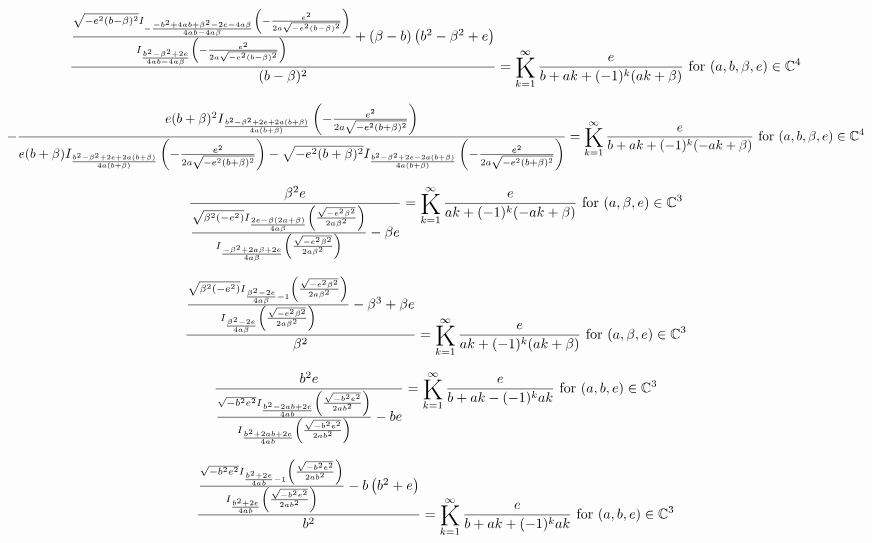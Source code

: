 \documentclass{article}
\newcommand{\bigK}{\mathop{\raisebox{-5pt}{\huge K}}}
\begin{document}
\[\frac{\frac{\sqrt{-e^2 (b-\beta )^2} I_{-\frac{-b^2+4 a b+\beta ^2-2 e-4 a \beta }{4 a b-4 a \beta }}\left(-\frac{e^2}{2 a \sqrt{-e^2 (b-\beta )^2}}\right)}{I_{\frac{b^2-\beta ^2+2 e}{4 a b-4 a \beta }}\left(-\frac{e^2}{2 a \sqrt{-e^2 (b-\beta )^2}}\right)}+(\beta -b) \left(b^2-\beta ^2+e\right)}{(b-\beta )^2}=\bigK_{k=1}^{\infty}\frac{e}{b+a k+(-1)^k (a k+\beta )}\text{ for }(a,b,\beta ,e)\in \mathbb{C}^4\] 

\[-\frac{e (b+\beta )^2 I_{\frac{b^2-\beta ^2+2 e+2 a (b+\beta )}{4 a (b+\beta )}}\left(-\frac{e^2}{2 a \sqrt{-e^2 (b+\beta )^2}}\right)}{e (b+\beta ) I_{\frac{b^2-\beta ^2+2 e+2 a (b+\beta )}{4 a (b+\beta )}}\left(-\frac{e^2}{2 a \sqrt{-e^2 (b+\beta )^2}}\right)-\sqrt{-e^2 (b+\beta )^2} I_{\frac{b^2-\beta ^2+2 e-2 a (b+\beta )}{4 a (b+\beta )}}\left(-\frac{e^2}{2 a \sqrt{-e^2 (b+\beta )^2}}\right)}=\bigK_{k=1}^{\infty}\frac{e}{b+a k+(-1)^k (-a k+\beta )}\text{ for }(a,b,\beta ,e)\in \mathbb{C}^4\] 

\[\frac{\beta ^2 e}{\frac{\sqrt{\beta ^2 \left(-e^2\right)} I_{\frac{2 e-\beta  (2 a+\beta )}{4 a \beta }}\left(\frac{\sqrt{-e^2 \beta ^2}}{2 a \beta ^2}\right)}{I_{\frac{-\beta ^2+2 a \beta +2 e}{4 a \beta }}\left(\frac{\sqrt{-e^2 \beta ^2}}{2 a \beta ^2}\right)}-\beta  e}=\bigK_{k=1}^{\infty}\frac{e}{a k+(-1)^k (-a k+\beta )}\text{ for }(a,\beta ,e)\in \mathbb{C}^3\] 

\[\frac{\frac{\sqrt{\beta ^2 \left(-e^2\right)} I_{\frac{\beta ^2-2 e}{4 a \beta }-1}\left(\frac{\sqrt{-e^2 \beta ^2}}{2 a \beta ^2}\right)}{I_{\frac{\beta ^2-2 e}{4 a \beta }}\left(\frac{\sqrt{-e^2 \beta ^2}}{2 a \beta ^2}\right)}-\beta ^3+\beta  e}{\beta ^2}=\bigK_{k=1}^{\infty}\frac{e}{a k+(-1)^k (a k+\beta )}\text{ for }(a,\beta ,e)\in \mathbb{C}^3\] 

\[\frac{b^2 e}{\frac{\sqrt{-b^2 e^2} I_{\frac{b^2-2 a b+2 e}{4 a b}}\left(\frac{\sqrt{-b^2 e^2}}{2 a b^2}\right)}{I_{\frac{b^2+2 a b+2 e}{4 a b}}\left(\frac{\sqrt{-b^2 e^2}}{2 a b^2}\right)}-b e}=\bigK_{k=1}^{\infty}\frac{e}{b+a k-(-1)^k a k}\text{ for }(a,b,e)\in \mathbb{C}^3\] 

\[\frac{\frac{\sqrt{-b^2 e^2} I_{\frac{b^2+2 e}{4 a b}-1}\left(\frac{\sqrt{-b^2 e^2}}{2 a b^2}\right)}{I_{\frac{b^2+2 e}{4 a b}}\left(\frac{\sqrt{-b^2 e^2}}{2 a b^2}\right)}-b \left(b^2+e\right)}{b^2}=\bigK_{k=1}^{\infty}\frac{e}{b+a k+(-1)^k a k}\text{ for }(a,b,e)\in \mathbb{C}^3\] 
\end{document}
